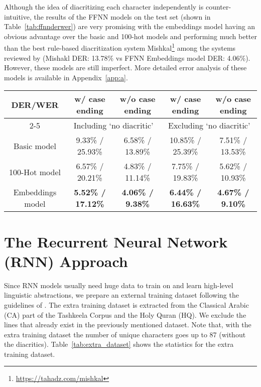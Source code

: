 \documentclass[11pt,a4paper]{article}
\newcommand{\para}[1]{\medskip \noindent {\bf #1}}
\begin{document}
\para{Results and Analysis.}
Although the idea of diacritizing each character independently is counter-intuitive, the results of the FFNN models on the test set (shown in Table~\ref{tab:ffnnderwer}) are very promising with the embeddings model having an obvious advantage over the basic and 100-hot models and performing much better than the best rule-based diacritization system Mishkal\footnote{\url{https://tahadz.com/mishkal}} among the systems reviewed by \cite{dataset} (Mishakl DER: 13.78\% vs FFNN Embeddings model DER: 4.06\%). However, these models are still imperfect.
More detailed error analysis of these models is available in Appendix~\ref{app:a}.

\begin{table*}
\centering
\caption{DER/WER comparison of the different FFNN models on the test set}
\label{tab:ffnnderwer}
\begin{tabular}{|c|c|c|c|c|}
\hline
\multirow{2}{*}{DER/WER} & w/ case ending & w/o case ending & w/ case ending & w/o case ending \\ \cline{2-5} 
 & \multicolumn{2}{c|}{Including `no diacritic'} & \multicolumn{2}{c|}{Excluding `no diacritic'} \\ \hline
Basic model & \small9.33\% / \small25.93\% & \small6.58\% / \small13.89\% & \small10.85\% / \small25.39\% & \small7.51\% / \small13.53\% \\ \hline
100-Hot model & \small6.57\% / \small20.21\% & \small4.83\% / \small11.14\% & \small7.75\% / \small19.83\% & \small5.62\% / \small10.93\% \\ \hline
Embeddings model & \textbf{\small5.52\% / \small17.12\%} & \textbf{\small4.06\% / \small9.38\%} & \textbf{\small6.44\% / \small16.63\%} & \textbf{\small4.67\% / \small9.10\%} \\ \hline
\end{tabular}
\end{table*}

\section{The Recurrent Neural Network (RNN) Approach}
\label{sec:rnn}

Since RNN models usually need huge data to train on and learn high-level linguistic abstractions, we prepare an external training dataset following the guidelines of \cite{dataset}. The extra training dataset is extracted from the Classical Arabic (CA) part of the Tashkeela Corpus and the Holy Quran (HQ). We exclude the lines that already exist in the previously mentioned dataset. Note that, with the extra training dataset the number of unique characters goes up to 87 (without the diacritics). Table~\ref{tab:extra_dataset} shows the statistics for the extra training dataset.
\end{document}
